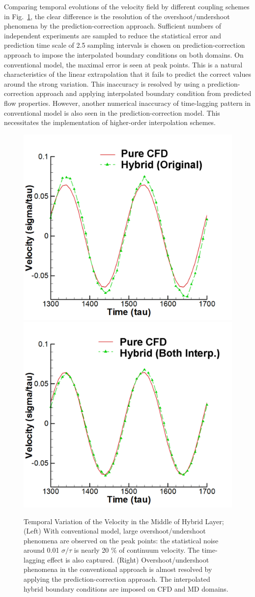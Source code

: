 \documentclass[preprint,12pt]{elsarticle}
\begin{document}
Comparing temporal evolutions of the velocity field by different coupling schemes in Fig.~\ref{Temporal1}, the clear difference is the resolution of the overshoot/undershoot phenomena by the prediction-correction approach. Sufficient numbers of independent experiments are sampled to reduce the statistical error and prediction time scale of 2.5 sampling intervals is chosen on prediction-correction approach to impose the interpolated boundary conditions on both domains. On conventional model, the maximal error is seen at peak points. This is a natural characteristics of the linear extrapolation that it fails to predict the correct values around the strong variation. This inaccuracy is resolved by using a prediction-correction approach and applying interpolated boundary condition from predicted flow properties. However, another numerical inaccuracy of time-lagging pattern in conventional model is also seen in the prediction-correction model. This necessitates the implementation of higher-order interpolation schemes.


\begin{figure}
\centering
\includegraphics[width=0.6\linewidth]{Stokes_Org_Multi.pdf}
\hskip 1cm
\includegraphics[width=0.6\linewidth]{Stokes_Both_Multi.pdf}
\vskip-0.2cm
\caption{\small Temporal Variation of the Velocity in the Middle of Hybrid Layer; (Left) With conventional model, large overshoot/undershoot phenomena are observed on the peak points: the statistical noise around 0.01 $\sigma/\tau$ is nearly 20 $\%$ of continuum velocity. The time-lagging effect is also captured. (Right) Overshoot/undershoot phenomena in the conventional approach is almost resolved by applying the prediction-correction approach. The interpolated hybrid boundary conditions are imposed on CFD and MD domains.}
\label{Temporal1}
\end{figure}
\end{document}
